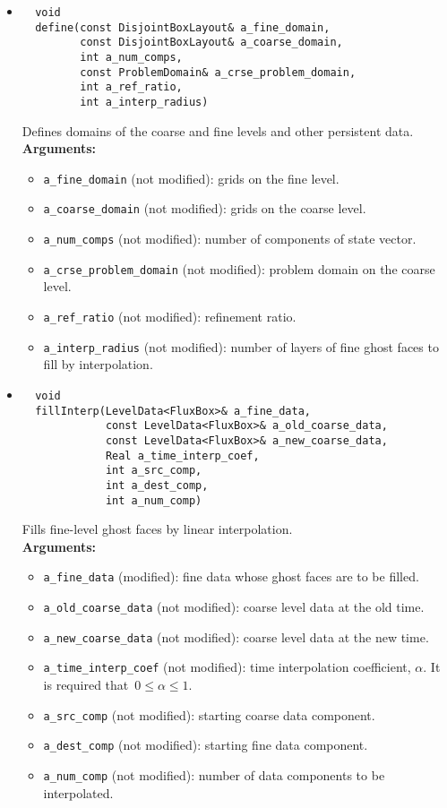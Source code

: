 \begin{itemize}
\item
\begin{verbatim}
  void
  define(const DisjointBoxLayout& a_fine_domain,
         const DisjointBoxLayout& a_coarse_domain,
         int a_num_comps,
         const ProblemDomain& a_crse_problem_domain,
         int a_ref_ratio,
         int a_interp_radius)
\end{verbatim}
Defines domains of the coarse and fine levels and other persistent data.  
\\ {\bf Arguments:}
  \begin{itemize}
  \item
  \verb|a_fine_domain| (not modified): grids on the fine level. 
  \item
  \verb|a_coarse_domain| (not modified): grids on the coarse level. 
  \item
  \verb|a_num_comps| (not modified): number of components of state vector. 
  \item
  \verb|a_crse_problem_domain| (not modified): problem domain on the coarse
  level. 
  \item
  \verb|a_ref_ratio| (not modified): refinement ratio.
  \item
  \verb|a_interp_radius| (not modified): number of layers of fine ghost
  faces to fill by interpolation. 
  \end{itemize}


\item
\begin{verbatim}
  void
  fillInterp(LevelData<FluxBox>& a_fine_data,
             const LevelData<FluxBox>& a_old_coarse_data,
             const LevelData<FluxBox>& a_new_coarse_data,
             Real a_time_interp_coef,
             int a_src_comp,
             int a_dest_comp,
             int a_num_comp)
\end{verbatim}
Fills fine-level ghost faces by linear interpolation.
\\ {\bf Arguments:}
  \begin{itemize}
  \item
  \verb|a_fine_data| (modified): fine data whose ghost
  faces are to be filled.
  \item
  \verb|a_old_coarse_data| (not modified): coarse level data at
  the old time.
  \item
  \verb|a_new_coarse_data| (not modified): coarse level data at
  the new time.
  \item
  \verb|a_time_interp_coef| (not modified): time interpolation
  coefficient, $\alpha$.  It is required
  that~$0 \le \alpha \le 1$.
  \item
  \verb|a_src_comp| (not modified): starting coarse data component.
  \item
  \verb|a_dest_comp| (not modified): starting fine data component.
  \item
  \verb|a_num_comp| (not modified): number of data components to be
  interpolated.
  \end{itemize}

\end{itemize}
